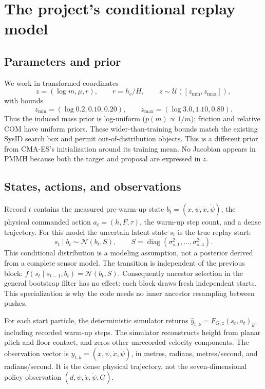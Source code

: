 \documentclass[11pt]{article}
\begin{document}
\section{The project's conditional replay model}
\subsection{Parameters and prior}
We work in transformed coordinates
\begin{equation}
 z=(\log m,\mu,r),\qquad r=h_c/H,\qquad
 z\sim\mathcal U([z_{\min},z_{\max}]),
\end{equation}
with bounds
\begin{equation}
 z_{\min}=(\log 0.2,0.10,0.20),\qquad
 z_{\max}=(\log 3.0,1.10,0.80).
\end{equation}
Thus the induced mass prior is log-uniform ($p(m)\propto1/m$); friction
and relative COM have uniform priors. These wider-than-training bounds
match the existing SysID search box and permit out-of-distribution
objects. This is a different prior from CMA-ES's initialization around
its training mean. No Jacobian appears in PMMH because both the target
and proposal are expressed in $z$.

\subsection{States, actions, and observations}
Record $t$ contains the measured pre-warm-up state
$b_t=(x,\psi,\dot x,\dot\psi)$, the physical commanded action
$a_t=(h,F,\tau)$, the warm-up step count, and a dense trajectory.
For this model the uncertain latent state $s_t$ is the true replay start:
\begin{equation}
 s_t\mid b_t\sim\mathcal N(b_t,S),\qquad
 S=\operatorname{diag}(\sigma_{s,1}^2,\ldots,\sigma_{s,4}^2).
\end{equation}
This conditional distribution is a modeling assumption, not a posterior
derived from a complete sensor model. The transition is independent of
the previous block: $f(s_t\mid s_{t-1},b_t)=\mathcal N(b_t,S)$.
Consequently ancestor selection in the general bootstrap filter has no
effect: each block draws fresh independent starts. This specialization
is why the code needs no inner ancestor resampling between pushes.

For each start particle, the deterministic simulator returns
$\widehat y_{t,k}=F_{G,z}(s_t,a_t)_k$, including recorded warm-up steps.
The simulator reconstructs height from planar pitch and floor contact,
and zeros other unrecorded velocity components. The observation vector is
$y_{t,k}=(x,\psi,\dot x,\dot\psi)$, in metres, radians, metres/second,
and radians/second. It is the dense physical trajectory, not the
seven-dimensional policy observation $(d,\psi,\dot x,\dot\psi,G)$.
\end{document}
